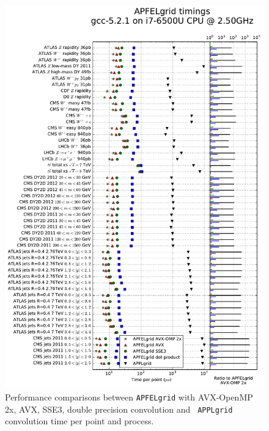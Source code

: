 \documentclass[preprint,12pt]{elsarticle}
\begin{document}
\begin{figure}
  \centering
  \includegraphics[scale=0.6]{plots/t0a}
\caption{\small Performance comparisons between {\tt APFELgrid} with
  AVX-OpenMP 2x, AVX, SSE3, double precision convolution and {\tt
    APPLgrid} convolution time per point and process.}
\label{fig:timings}
\end{figure}
\end{document}
